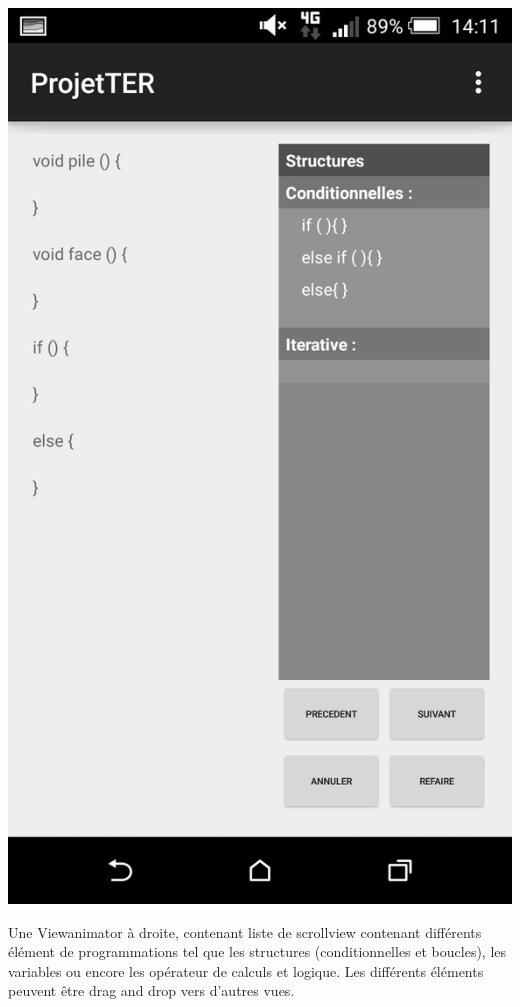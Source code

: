 \documentclass[a4paper]{article}
\begin{document}
\begin{center}
\includegraphics[scale=0.1]{img/create1.jpg}
\end{center}
Une Viewanimator à droite, contenant liste de scrollview contenant différents élément de programmations tel que les structures (conditionnelles et boucles), les variables ou encore les opérateur de calculs et logique. Les différents éléments peuvent être drag and drop vers d’autres vues. \\
\\
\end{document}
